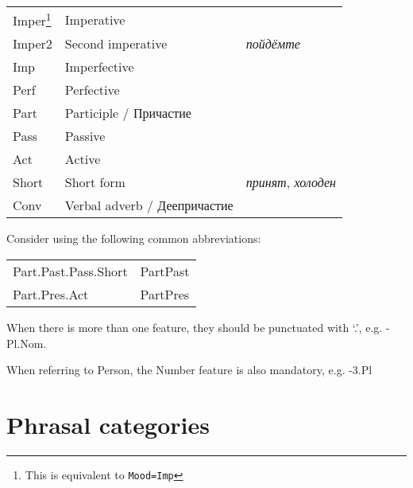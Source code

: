 \documentclass[a4paper,11pt, onecolumn,twoside]{article}
\begin{document}
{\begin{tabular}{lll}
Imper\footnote{This is equivalent to \texttt{Mood=Imp}} & Imperative & ~ \\
Imper2 & Second imperative & \emph{пойдёмте} \\
Imp & Imperfective & ~ \\
Perf & Perfective & ~ \\
Part &  Participle / Причастие & ~   \\
Pass & Passive & ~ \\
Act & Active & ~ \\
Short & Short form & \emph{принят}, \emph{холоден} \\
Conv & Verbal adverb / Деепричастие & ~ \\
\bottomrule
\end{tabular}
}

Consider using the following common abbreviations: 

\begin{tabular}{ll}
  Part.Past.Pass.Short & PartPast  \\
  Part.Pres.Act & PartPres \\
\end{tabular}

When there is more than one feature, they should be punctuated with `.', e.g. -Pl.Nom.

When referring to Person, the Number feature is also mandatory, e.g. -3.Pl

\section{Phrasal categories}
\end{document}
